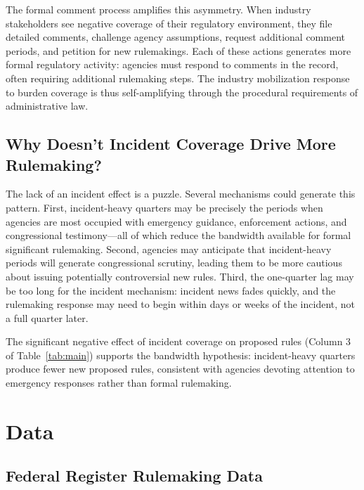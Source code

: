 \documentclass[12pt]{article}
\begin{document}
The formal comment process amplifies this asymmetry. When industry stakeholders see negative coverage of their regulatory environment, they file detailed comments, challenge agency assumptions, request additional comment periods, and petition for new rulemakings. Each of these actions generates more formal regulatory activity: agencies must respond to comments in the record, often requiring additional rulemaking steps. The industry mobilization response to burden coverage is thus self-amplifying through the procedural requirements of administrative law.

\subsection{Why Doesn't Incident Coverage Drive More Rulemaking?}

The lack of an incident effect is a puzzle. Several mechanisms could generate this pattern. First, incident-heavy quarters may be precisely the periods when agencies are most occupied with emergency guidance, enforcement actions, and congressional testimony---all of which reduce the bandwidth available for formal significant rulemaking. Second, agencies may anticipate that incident-heavy periods will generate congressional scrutiny, leading them to be more cautious about issuing potentially controversial new rules. Third, the one-quarter lag may be too long for the incident mechanism: incident news fades quickly, and the rulemaking response may need to begin within days or weeks of the incident, not a full quarter later.

The significant negative effect of incident coverage on proposed rules (Column 3 of Table~\ref{tab:main}) supports the bandwidth hypothesis: incident-heavy quarters produce fewer new proposed rules, consistent with agencies devoting attention to emergency responses rather than formal rulemaking.

\section{Data}
\label{sec:data}

\subsection{Federal Register Rulemaking Data}
\end{document}
